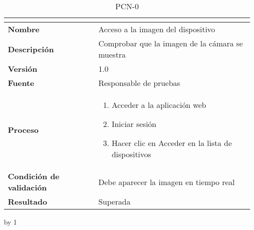 \begin{table}[H]
	\caption{PCN-0\number\pcn}
	\begin{tabular}{|l|p{}|}
		\hline
		\multicolumn{2}{|c|}{\cellcolor[HTML]{BFBFBF}{\color[HTML]{000000} \textbf{PCN-0\number\pcn}}} \\ \hline
		\textbf{Nombre}                  & Acceso a la imagen del dispositivo              \\ \hline
		\textbf{Descripción}             & Comprobar que la imagen de la cámara se muestra \\ \hline
		\textbf{Versión}                 & 1.0                                             \\ \hline
		\textbf{Fuente}                  & Responsable de pruebas                          \\ \hline
		\textbf{Proceso}                 & \begin{enumerate}
			\item Acceder a la aplicación web
			\item Iniciar sesión
			\item Hacer clic en Acceder en la lista de dispositivos
		\end{enumerate}                      \\ \hline
		\textbf{Condición de validación} & Debe aparecer la imagen en tiempo real          \\ \hline
		\textbf{Resultado}               & Superada                                        \\ \hline
	\end{tabular}
\end{table}
\advance\pcn by 1

